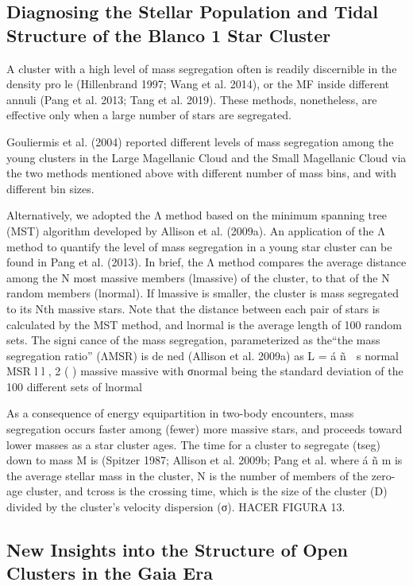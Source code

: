 \documentclass[../Main.tex]{subfiles}
\begin{document}
{\subsection{Diagnosing the Stellar Population and Tidal Structure of the Blanco 1 Star Cluster}

A cluster with a high level of mass segregation often is
readily discernible in the density pro le (Hillenbrand 1997;
Wang et al. 2014), or the MF inside different annuli (Pang et al.
2013; Tang et al. 2019). These methods, nonetheless, are
effective only when a large number of stars are segregated.

Gouliermis et al. (2004) reported different levels of mass
segregation among the young clusters in the Large Magellanic Cloud and the Small Magellanic Cloud via the two methods mentioned above with different number of mass bins, and with
different bin sizes. 

Alternatively, we adopted the Λ method based on the minimum spanning tree (MST) algorithm developed by Allison et al. (2009a). An application of the Λ method to quantify the level of mass segregation in a young star cluster can be found in Pang et al. (2013). In brief, the Λ method compares the average distance among the N most massive members (lmassive) of the cluster, to that of the N random members (lnormal). If lmassive is smaller, the cluster is mass segregated to its Nth
massive stars. Note that the distance between each pair of stars
is calculated by the MST method, and lnormal is the average
length of 100 random sets. The signi cance of the mass
segregation, parameterized as the“the mass segregation ratio”
(ΛMSR) is de ned (Allison et al. 2009a) as
L = á ñ 
s
normal
MSR
l l , 2
( )
massive
massive
with σnormal being the standard deviation of the 100 different
sets of lnormal

As a consequence of energy equipartition in two-body
encounters, mass segregation occurs faster among (fewer) more
massive stars, and proceeds toward lower masses as a star
cluster ages. The time for a cluster to segregate (tseg) down to mass M is (Spitzer 1987; Allison et al. 2009b; Pang et al.
where á ñ
m is the average stellar mass in the cluster, N is the number of members of the zero-age cluster, and tcross is the crossing time, which is the size of the cluster (D) divided by the cluster’s velocity dispersion (σ).
HACER FIGURA 13.

\subsection{New Insights into the Structure of Open Clusters in the Gaia Era}

}
\end{document}
